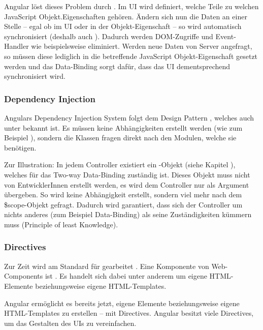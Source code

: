 Angular löst dieses Problem durch . Im UI wird definiert, welche Teile zu welchen JavaScript Objekt.Eigenschaften gehören. Ändern sich nun die Daten an einer Stelle -- egal ob im UI oder in der Objekt-Eigenschaft -- so wird automatisch synchronisiert (deshalb auch ). Dadurch werden DOM-Zugriffe und Event-Handler wie beispielsweise  eliminiert. Werden neue Daten von Server angefragt, so müssen diese lediglich in die betreffende JavaScript Objekt-Eigenschaft gesetzt werden und das Data-Binding sorgt dafür, dass das UI dementsprechend synchronisiert wird.

\subsubsection{Dependency Injection}
Angulars Dependency Injection System folgt dem Design Pattern , welches auch unter  bekannt ist. Es müssen keine Abhängigkeiten erstellt werden (wie zum Beispiel ), sondern die Klassen fragen direkt nach den Modulen, welche sie benötigen.

Zur Illustration: In jedem Controller existiert ein -Objekt (siehe Kapitel ), welches für das Two-way Data-Binding zuständig ist. Dieses Objekt muss nicht von EntwicklerInnen erstellt werden, es wird dem Controller nur als Argument übergeben. So wird keine Abhängigkeit erstellt, sondern viel mehr nach dem \$scope-Objekt gefragt. Dadurch wird garantiert, dass sich der Controller um nichts anderes (zum Beispiel Data-Binding) als seine Zuständigkeiten kümmern muss (Principle of least Knowledge).

\subsubsection{Directives}
Zur Zeit wird am Standard für  gearbeitet \autocite{Glazkov:13:IWC}. Eine Komponente von Web-Components ist . Es handelt sich dabei unter anderem um eigene HTML-Elemente beziehungsweise eigene HTML-Templates.

Angular ermöglicht es bereits jetzt, eigene Elemente beziehungsweise eigene HTML-Templates zu erstellen -- mit Directives. Angular besitzt viele Directives, um das Gestalten des UIs zu vereinfachen.

